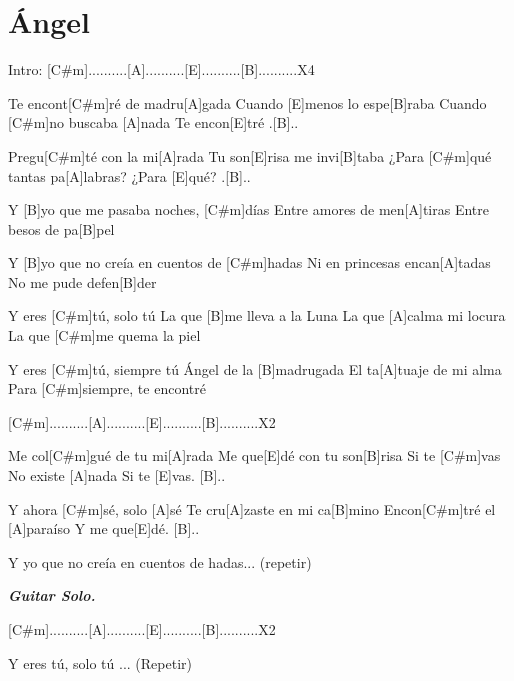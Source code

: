 \section{Ángel}

\noindent
\chordCshm
\chordB
\chordA
\chordE

\vspace{1cm}

\begin{guitar}
\begin{multicols}{2}

	Intro: [C#m]..........[A]..........[E]..........[B]..........X4


	Te encont[C#m]ré de madru[A]gada
	Cuando [E]menos lo espe[B]raba
	Cuando [C#m]no buscaba [A]nada
	Te encon[E]tré .[B]..



	Pregu[C#m]té con la mi[A]rada
	Tu son[E]risa me invi[B]taba
	¿Para [C#m]qué tantas pa[A]labras?
	¿Para [E]qué? .[B]..



	Y [B]yo que me pasaba noches, [C#m]días
	Entre amores de men[A]tiras
	Entre besos de pa[B]pel



	Y [B]yo que no creía en cuentos de [C#m]hadas
	Ni en princesas encan[A]tadas
	No me pude defen[B]der



	Y eres [C#m]tú, solo tú
	La que [B]me lleva a la Luna
	La que [A]calma mi locura
	La que [C#m]me quema la piel



	Y eres [C#m]tú, siempre tú
	Ángel de la [B]madrugada
	El ta[A]tuaje de mi alma
	Para [C#m]siempre, te encontré



	[C#m]..........[A]..........[E]..........[B]..........X2



	Me col[C#m]gué de tu mi[A]rada
	Me que[E]dé con tu son[B]risa
	Si te [C#m]vas
	No existe [A]nada
	Si te [E]vas. [B]..



	Y ahora [C#m]sé, solo [A]sé
	Te cru[A]zaste en mi ca[B]mino
	Encon[C#m]tré el [A]paraíso
	Y me que[E]dé. [B]..



	Y yo que no creía en cuentos de hadas... (repetir)

	\textit{\textbf{Guitar Solo.}}


	[C#m]..........[A]..........[E]..........[B]..........X2

	Y eres tú, solo tú ... (Repetir)

	\vspace{0.3cm}
\end{multicols}
\end{guitar}




